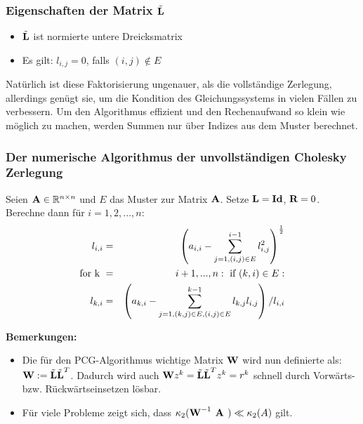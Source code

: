 \subsubsection{Eigenschaften der Matrix $\tilde{{\textbf{L}}}$}\label{sss.Eigenschaften L CZ}
\begin{itemize}
\item $\tilde{{\textbf{L}}}$ ist normierte untere Dreicksmatrix
\item Es gilt: $l_{i,j} = 0$, falls $(i,j) \notin E$
\end{itemize}

Natürlich ist diese Faktorisierung ungenauer, als die vollständige Zerlegung, allerdings genügt sie, um die Kondition des Gleichungssystems in vielen Fällen zu verbessern. Um den Algorithmus effizient und den Rechenaufwand so klein wie möglich zu machen, werden Summen nur über Indizes aus dem Muster berechnet.

\subsubsection{Der numerische Algorithmus der unvollständigen Cholesky Zerlegung}\label{sss.Cholesky-Algorithmus}

Seien ${\textbf{A}} \in \mathbb{R}^{n \times n}$ und $E$ das Muster zur Matrix ${\textbf{A}}$. Setze ${\textbf{L}} = {\textbf{Id}}$, ${\textbf{R}} = 0$. Berechne dann für $i=1,2,...,n$:
\begin{eqnarray}
l_{i,i} &=& \left( a_{i,i} - \sum^{i-1}_{j=1,(i,j) \in E} l_{i,j}^{2} \right)^{\frac {1} {2}} \\
\textnormal{for k } &=& i+1,...,n: \textnormal{ if } (k,i) \in E: \\
l_{k,i} &=& \left( a_{k,i} - \sum^{k-1}_{j=1,(k,j) \in E, (i,j) \in E} l_{k,j} l_{i,j} \right) / l_{i,i}
\end{eqnarray}

\textbf{Bemerkungen:}

\begin{itemize}
\item Die für den PCG-Algorithmus wichtige Matrix ${\textbf{W}}$ wird nun definierte als: ${\textbf{W}} := \tilde{{\textbf{L}}} \tilde{{\textbf{L}}}^{T}$. Dadurch wird auch ${\textbf{W}}z^{k} = \tilde{{\textbf{L}}} \tilde{{\textbf{L}}}^{T}z^{k} = r^{k}$ schnell durch Vorwärts- bzw. Rückwärtseinsetzen lösbar.
\item Für viele Probleme zeigt sich, dass $\kappa_{2}({\textbf{W}}^{-1} {\textbf{ {\textbf{A}} }}) \ll \kappa_{2} (A)$ gilt. \\
\end{itemize}

